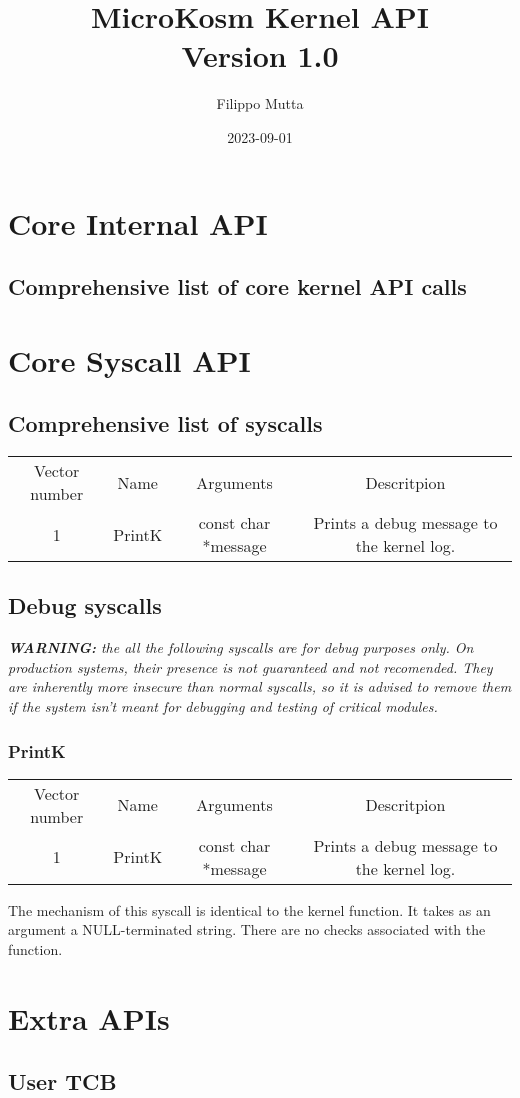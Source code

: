 \documentclass{report}
\title{%
  \large MicroKosm Kernel API \\
   Version 1.0 \\
   }
\date{2023-09-01}
\author{Filippo Mutta}
\begin{document}
\maketitle
\newpage


\tableofcontents

\chapter{Core Internal API}
\section{Comprehensive list of core kernel API calls}

\chapter{Core Syscall API}
\section{Comprehensive list of syscalls}

\begin{tabular}{ |c|c|c|c| }
	Vector number & Name & Arguments & Descritpion \\ 
	1 & PrintK & const char *message & Prints a debug message to the kernel log. \\
\end{tabular}
\section{Debug syscalls}
\textit{\textbf{WARNING:} the all the following syscalls are for debug purposes only. On production systems, their presence is not guaranteed and not recomended. They are inherently more insecure than normal syscalls, so it is advised to remove them if the system isn't meant for debugging and testing of critical modules.}
\subsection{PrintK}
\begin{tabular}{ |c|c|c|c| }
	Vector number & Name & Arguments & Descritpion \\ 
	1 & PrintK & const char *message & Prints a debug message to the kernel log. \\
\end{tabular}

The mechanism of this syscall is identical to the kernel function. It takes as an argument a NULL-terminated string. There are no checks associated with the function.

\chapter{Extra APIs}
\section{User TCB}
\end{document}
